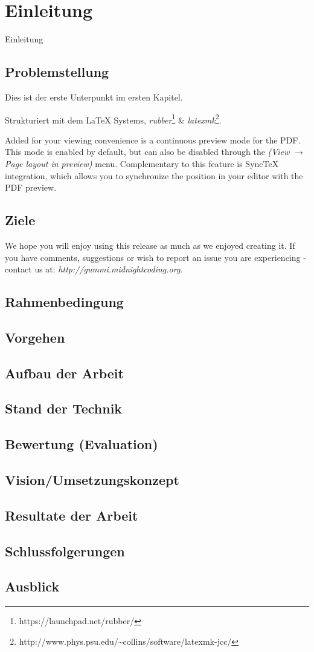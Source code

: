 \chapter{Einleitung}
Einleitung

\section{Problemstellung}

Dies ist der erste Unterpunkt im ersten Kapitel.

Strukturiert mit dem {\LaTeX} Systems, \emph{rubber}\footnote{https://launchpad.net/rubber/} \& \emph{latexmk}\footnote{http://www.phys.psu.edu/{\textasciitilde}collins/software/latexmk-jcc/}. 

Added for your viewing convenience is a continuous preview mode for the PDF. This mode is enabled by default, but can also be disabled through the \emph{(View $\rightarrow$ Page layout in preview)} menu. Complementary to this feature is SyncTeX integration, which allows you to synchronize the position in your editor with the PDF preview. 

\section{Ziele}
We hope you will enjoy using this release as much as we enjoyed creating it. If you have comments, suggestions or wish to report an issue you are experiencing - contact us at: \emph{http://gummi.midnightcoding.org}.

\section{Rahmenbedingung}

\section{Vorgehen}

\section{Aufbau der Arbeit}

\section{Stand der Technik}

\section{Bewertung (Evaluation)}

\section{Vision/Umsetzungskonzept}

\section{Resultate der Arbeit}

\section{Schlussfolgerungen}

\section{Ausblick}